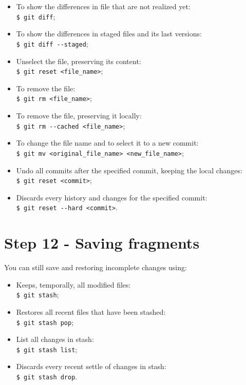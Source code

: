 \documentclass[12pt,a4paper,titlepage,brazil]{article}
\begin{document}
{\begin{itemize}
 \item To show the differences in file that are not realized yet:\\
   \texttt{\$ git diff};
 \item To show the differences in staged files and its last versions:\\
   \texttt{\$ git diff -\hspace{0.01cm}-staged};
 \item Unselect the file, preserving its content:\\
   \texttt{\$ git reset <file\_name>};
 \item To remove the file:\\
   \texttt{\$ git rm <file\_name>};
 \item To remove the file, preserving it locally:\\
   \texttt{\$ git rm -\hspace{0.01cm}-cached <file\_name>};
 \item To change the file name and to select it to a new commit:\\
   \texttt{\$ git mv <original\_file\_name> <new\_file\_name>};
 \item Undo all commits after the specified commit, keeping the local changes:\\
   \texttt{\$ git reset <commit>};   
 \item Discards every history and changes for the specified commit:\\
   \texttt{\$ git reset -\hspace{0.01cm}-hard <commit>}.   
\end{itemize}  


\section{Step 12 - Saving fragments}

You can still save and restoring incomplete changes using:

\begin{itemize}
 \item Keeps, temporally, all modified files:\\
   \texttt{\$ git stash};
 \item Restores all recent files that have been stashed:\\
   \texttt{\$ git stash pop};
 \item List all changes in stash:\\
   \texttt{\$ git stash list};
 \item Discards every recent settle of changes in stash:\\
   \texttt{\$ git stash drop}.
\end{itemize}  

}
\end{document}

